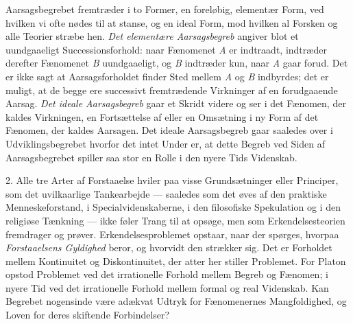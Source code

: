 \documentclass[12pt,a4paper,openany]{book}
\newcommand{\opage}[1]{\marginnote{\footnotesize\textit{[#1]}}}
\begin{document}
Aarsagsbegrebet fremtræder i to Former, en foreløbig, elementær Form, ved
hvilken vi ofte nødes til at stanse, og en ideal Form, mod hvilken al Forsken
og alle Teorier stræbe hen. \textit{Det elementære Aarsagsbegreb} angiver blot
et uundgaaeligt Successionsforhold: naar Fænomenet \textit{A} er indtraadt,
indtræder derefter Fænomenet \textit{B} uundgaaeligt, og \textit{B} indtræder
kun, naar \textit{A} gaar forud. Det er ikke sagt at Aarsagsforholdet finder
Sted mellem \textit{A} og \textit{B} indbyrdes; det er muligt, at de begge ere
successivt fremtrædende Virkninger af en forudgaaende Aarsag. \textit{Det ideale
\opage{31}Aarsagsbegreb} gaar et Skridt videre og ser i det Fænomen, der kaldes
Virkningen, en Fortsættelse af eller en Omsætning i ny Form af det Fænomen, der
kaldes Aarsagen. Det ideale Aarsagsbegreb gaar saaledes over i
Udviklingsbegrebet hvorfor det intet Under er, at dette Begreb ved Siden af
Aarsagsbegrebet spiller saa stor en Rolle i den nyere Tids Videnskab.

2. Alle tre Arter af Forstaaelse hviler paa visse Grundsætninger eller
Principer, som det uvilkaarlige Tankearbejde --- saaledes som det øves af den
praktiske Menneskeforstand, i Specialvidenskaberne, i den filosofiske
Spekulation og i den religiøse Tænkning --- ikke føler Trang til at opsøge, men
som Erkendelsesteorien fremdrager og prøver. Erkendelsesproblemet opstaar, naar
der spørges, hvorpaa \textit{Forstaaelsens Gyldighed} beror, og hvorvidt den
strækker sig. Det er Forholdet mellem Kontinuitet og Diskontinuitet, der atter
her stiller Problemet. For Platon opstod Problemet ved det irrationelle Forhold
mellem Begreb og Fænomen; i nyere Tid ved det irrationelle Forhold mellem
formal og real Videnskab. Kan Begrebet nogensinde være adækvat Udtryk for
Fænomenernes Mangfoldighed, og Loven for deres skiftende Forbindelser?
\end{document}
